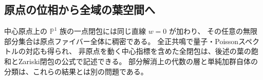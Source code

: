 \subsection{原点の位相から全域の葉空間へ}

中心原点上の $\mathbb P^1$ 族の一点閉包には同じ直線 $w=0$ が加わり、
その任意の無限部分集合は原点ファイバー全体に稠密である。
全正共鳴で量子・Poissonスペクトルの対応も得られ、
非原点を動く中心指標を含めた全閉包は、後述の葉の飽和とZariski閉包の公式で記述できる。
部分解消上の代数の層と単純加群自体の分類は、これらの結果とは別の問題である。
